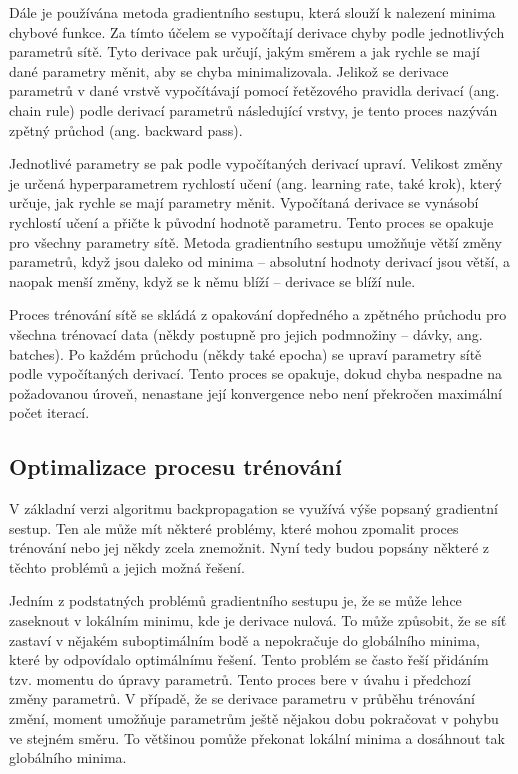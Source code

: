 Dále je používána metoda gradientního sestupu, která slouží k nalezení minima chybové
funkce. Za tímto účelem se vypočítají derivace chyby podle jednotlivých
parametrů sítě. Tyto derivace pak určují, jakým směrem a jak rychle se mají
dané parametry měnit, aby se chyba minimalizovala. Jelikož se derivace
parametrů v dané vrstvě vypočítávají pomocí řetězového pravidla derivací (ang.
chain rule) podle derivací parametrů následující vrstvy, je tento proces
nazýván zpětný průchod (ang. backward pass).

Jednotlivé parametry se pak podle vypočítaných derivací upraví. Velikost změny
je určená hyperparametrem rychlostí učení (ang. learning rate, také krok),
který určuje, jak rychle se mají parametry měnit. Vypočítaná derivace se
vynásobí rychlostí učení a přičte k původní hodnotě parametru. Tento proces se
opakuje pro všechny parametry sítě. Metoda gradientního sestupu umožňuje větší
změny parametrů, když jsou daleko od minima – absolutní hodnoty derivací jsou
větší, a naopak menší změny, když se k němu blíží – derivace se blíží nule.

Proces trénování sítě se skládá z opakování dopředného a zpětného průchodu pro
všechna trénovací data (někdy postupně pro jejich podmnožiny – dávky, ang.
batches). Po každém průchodu (někdy také epocha) se upraví parametry sítě podle
vypočítaných derivací. Tento proces se opakuje, dokud chyba nespadne na
požadovanou úroveň, nenastane její konvergence nebo není překročen maximální
počet iterací.

\subsection{Optimalizace procesu trénování}

V základní verzi algoritmu backpropagation se využívá výše popsaný gradientní
sestup. Ten ale může mít některé problémy, které mohou zpomalit proces
trénování nebo jej někdy zcela znemožnit. Nyní tedy budou popsány některé z
těchto problémů a jejich možná řešení.

Jedním z podstatných problémů gradientního sestupu je, že se může lehce
zaseknout v lokálním minimu, kde je derivace nulová. To může způsobit, že se
síť zastaví v nějakém suboptimálním bodě a nepokračuje do globálního minima,
které by odpovídalo optimálnímu řešení. Tento problém se často řeší přidáním
tzv. momentu do úpravy parametrů. Tento proces bere v úvahu i předchozí změny
parametrů. V případě, že se derivace parametru v průběhu trénování změní,
moment umožňuje parametrům ještě nějakou dobu pokračovat v pohybu ve stejném
směru. To většinou pomůže překonat lokální minima a dosáhnout tak globálního
minima.

